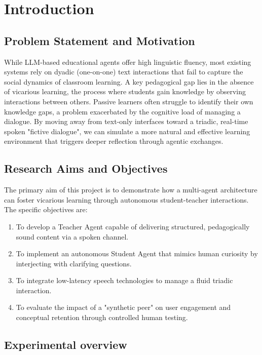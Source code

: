 \section{Introduction}
\label{sec:introduction}

\subsection{Problem Statement and Motivation}
While LLM-based educational agents offer high linguistic fluency,
most existing systems rely on dyadic (one-on-one) text interactions that fail to capture the social dynamics of classroom learning.
A key pedagogical gap lies in the absence of vicarious learning, the process where students gain knowledge by observing interactions between others.
Passive learners often struggle to identify their own knowledge gaps, a problem exacerbated by the cognitive load of managing a dialogue.
By moving away from text-only interfaces toward a triadic, real-time spoken "fictive dialogue",
we can simulate a more natural and effective learning environment that triggers deeper reflection through agentic exchanges.


\subsection{Research Aims and Objectives}
The primary aim of this project is to demonstrate how a multi-agent architecture can foster vicarious learning through autonomous student-teacher interactions.
The specific objectives are:
\begin{enumerate}[noitemsep, leftmargin=*]
  \item To develop a Teacher Agent capable of delivering structured, pedagogically sound content via a spoken channel.
  \item To implement an autonomous Student Agent that mimics human curiosity by interjecting with clarifying questions.
  \item To integrate low-latency speech technologies to manage a fluid triadic interaction.
  \item To evaluate the impact of a "synthetic peer" on user engagement and conceptual retention through controlled human testing.
\end{enumerate}

\subsection{Experimental overview}

